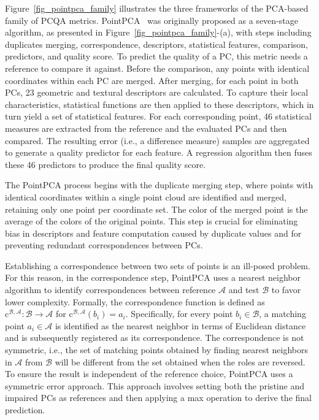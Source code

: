 \documentclass[final,3p,times,twocolumn]{elsarticle}
\begin{document}
Figure~\ref{fig_pointpca_family} illustrates the three frameworks of the PCA-based family of \gls{PCQA} metrics. PointPCA~\cite{alexiou2024pointpca} was originally proposed as a seven-stage algorithm, as presented in Figure~\ref{fig_pointpca_family}-(a), with steps including duplicates merging, correspondence, descriptors, statistical features, comparison, predictors, and quality score. To predict the quality of a \gls{PC}, this metric needs a reference to compare it against. Before the comparison, any points with identical coordinates within each \gls{PC} are merged. After merging, for each point in both \glspl{PC}, 23 geometric and textural descriptors are calculated. To capture their local characteristics, statistical functions are then applied to these descriptors, which in turn yield a set of statistical features. For each corresponding point, 46 statistical measures are extracted from the reference and the evaluated \glspl{PC} and then compared. The resulting error (i.e., a difference measure) samples are aggregated to generate a quality predictor for each feature. A regression algorithm then fuses these 46 predictors to produce the final quality score.

The PointPCA process begins with the duplicate merging step, where points with identical coordinates within a single point cloud are identified and merged, retaining only one point per coordinate set. The color of the merged point is the average of the colors of the original points. This step is crucial for eliminating bias in descriptors and feature computation caused by duplicate values and for preventing redundant correspondences between \glspl{PC}.

Establishing a correspondence between two sets of points is an ill-posed problem. For this reason, in the correspondence step, PointPCA uses a nearest neighbor algorithm to identify correspondences between reference $\mathcal{A}$ and test $\mathcal{B}$ to favor lower complexity. Formally, the correspondence function is defined as $\mathrm{c}^{ \mathcal{B}, \mathcal{A} }:  \mathcal{B} \rightarrow  \mathcal{A}$ for $\mathrm{c}^{\mathcal{B}, \mathcal{A}} (b_i)=a_i$. Specifically, for every point $b_i \in \mathcal{B}$, a matching point $a_i \in \mathcal{A}$ is identified as the nearest neighbor in terms of Euclidean distance and is subsequently registered as its correspondence. The correspondence is not symmetric, i.e., the set of matching points obtained by finding nearest neighbors in $\mathcal{A}$ from $\mathcal{B}$ will be different from the set obtained when the roles are reversed. To ensure the result is independent of the reference choice, PointPCA uses a symmetric error approach. This approach involves setting both the pristine and impaired \glspl{PC} as references and then applying a max operation to derive the final prediction.
\end{document}
